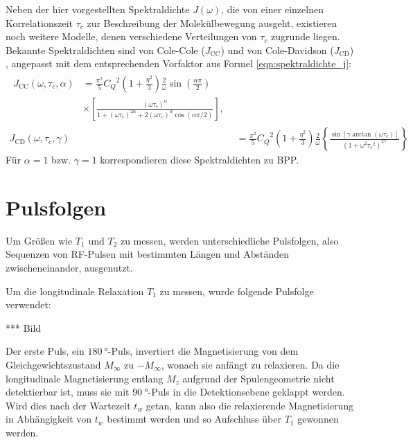 Neben der hier vorgestellten Spektraldichte $J(\omega)$, die von einer einzelnen Korrelationszeit $\tau_c$ zur Beschreibung der Molekülbewegung ausgeht, existieren noch weitere Modelle, denen verschiedene Verteilungen von $\tau_c$ zugrunde liegen. Bekannte Spektraldichten sind von Cole-Cole ($J_\text{CC}$) und von Cole-Davidson ($J_\text{CD}$) \cite[S. 105-108]{beckmann_relaxation}, angepasst mit dem entsprechenden Vorfaktor aus Formel \eqref{eqn:spektraldichte_j}:
\begin{align}
\begin{split}
    J_\text{CC}(\omega, \tau_c, \alpha) &= \frac{\pi^2}{5} {C_Q}^2 \left( 1 + \frac{\eta^2}{3} \right) \frac{2}{\omega} \sin \left( \frac{\alpha \pi}{2} \right) \\ &\times \left[ \frac{(\omega \tau_c)^\alpha}{1 + (\omega \tau_c)^{2\alpha} + 2 (\omega \tau_c)^\alpha \cos (\alpha \pi / 2)} \right],
\end{split} \\
    J_\text{CD}(\omega, \tau_c, \gamma) &= \frac{\pi^2}{5} {C_Q}^2 \left( 1 + \frac{\eta^2}{3} \right) \frac{2}{\omega} \left\{ \frac{\sin [\gamma \arctan(\omega \tau_c)]}{(1 + \omega^2 {\tau_c}^2)^{2\gamma}} \right\}
\end{align}
Für $\alpha = 1$ bzw. $\gamma = 1$ korrespondieren diese Spektraldichten zu BPP.





\section{Pulsfolgen} \label{section:exp:pulsfolgen}

Um Größen wie $T_1$ und $T_2$ zu messen, werden unterschiedliche Pulsfolgen, also Sequenzen von RF-Pulsen mit bestimmten Längen und Abständen zwischeneinander, ausgenutzt.

Um die longitudinale Relaxation $T_1$ zu messen, wurde folgende Pulsfolge verwendet:

*** Bild

Der erste Puls, ein $\SI{180}{\degree}$-Puls, invertiert die Magnetisierung von dem Gleichgewichtszustand $M_\infty$ zu $-M_\infty$, wonach sie anfängt zu relaxieren. Da die longitudinale Magnetisierung entlang $M_z$ aufgrund der Spulengeometrie nicht detektierbar ist, muss sie mit $\SI{90}{\degree}$-Puls in die Detektionsebene geklappt werden. Wird dies nach der Wartezeit $t_w$ getan, kann also die relaxierende Magnetisierung in Abhängigkeit von $t_w$ bestimmt werden und so Aufschluss über $T_1$ gewonnen werden.

